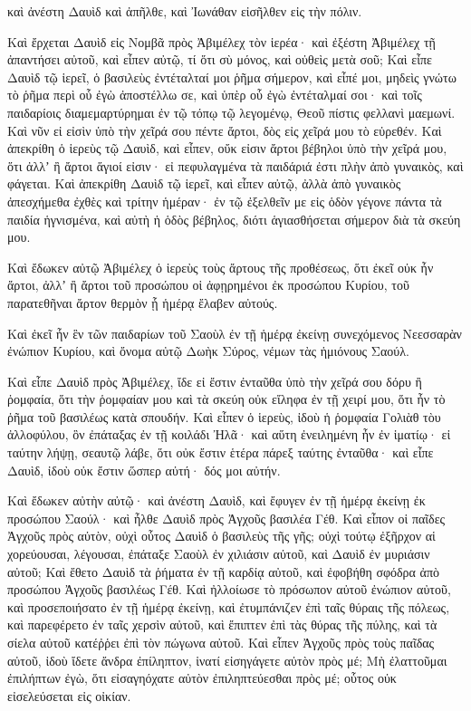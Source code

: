 {καὶ ἀνέστη Δαυὶδ καὶ ἀπῆλθε, καὶ Ἰωνάθαν εἰσῆλθεν εἰς τὴν πόλιν.
\par }{\PP {}Καὶ ἔρχεται Δαυὶδ εἰς Νομβᾶ πρὸς Ἀβιμέλεχ τὸν ἱερέα· καὶ ἐξέστη Ἀβιμέλεχ τῇ ἀπαντήσει αὐτοῦ, καὶ εἶπεν αὐτῷ, τί ὅτι σὺ μόνος, καὶ οὐθεὶς μετὰ σοῦ;
Καὶ εἶπε Δαυὶδ τῷ ἱερεῖ, ὁ βασιλεὺς ἐντέταλταί μοι ῥῆμα σήμερον, καὶ εἶπέ μοι, μηδεὶς γνώτω τὸ ῥῆμα περὶ οὗ ἐγὼ ἀποστέλλω σε, καὶ ὑπὲρ οὗ ἐγὼ ἐντέταλμαί σοι· καὶ τοῖς παιδαρίοις διαμεμαρτύρημαι ἐν τῷ τόπῳ τῷ λεγομένῳ, Θεοῦ πίστις φελλανὶ μαεμωνί.
Καὶ νῦν εἰ εἰσὶν ὑπὸ τὴν χεῖρά σου πέντε ἄρτοι, δὸς εἰς χεῖρά μου τὸ εὑρεθέν.
Καὶ ἀπεκρίθη ὁ ἱερεὺς τῷ Δαυὶδ, καὶ εἶπεν, οὔκ εἰσιν ἄρτοι βέβηλοι ὑπὸ τὴν χεῖρά μου, ὅτι ἀλλʼ ἢ ἄρτοι ἅγιοί εἰσιν· εἰ πεφυλαγμένα τὰ παιδάριά ἐστι πλὴν ἀπὸ γυναικὸς, καὶ φάγεται.
Καὶ ἀπεκρίθη Δαυὶδ τῷ ἱερεῖ, καὶ εἶπεν αὐτῷ, ἀλλὰ ἀπὸ γυναικὸς ἀπεσχήμεθα ἐχθὲς καὶ τρίτην ἡμέραν· ἐν τῷ ἐξελθεῖν με εἰς ὁδὸν γέγονε πάντα τὰ παιδία ἡγνισμένα, καὶ αὐτὴ ἡ ὁδὸς βέβηλος, διότι ἁγιασθήσεται σήμερον διὰ τὰ σκεύη μου.
\par }{\PP {}Καὶ ἔδωκεν αὐτῷ Ἀβιμέλεχ ὁ ἱερεὺς τοὺς ἄρτους τῆς προθέσεως, ὅτι ἐκεῖ οὐκ ἦν ἄρτοι, ἀλλʼ ἢ ἄρτοι τοῦ προσώπου οἱ ἀφῃρημένοι ἐκ προσώπου Κυρίου, τοῦ παρατεθῆναι ἄρτον θερμὸν ᾗ ἡμέρᾳ ἔλαβεν αὐτούς.
\par }{\PP {}Καὶ ἐκεῖ ἦν ἓν τῶν παιδαρίων τοῦ Σαοὺλ ἐν τῇ ἡμέρᾳ ἐκείνῃ συνεχόμενος Νεεσσαρὰν ἐνώπιον Κυρίου, καὶ ὄνομα αὐτῷ Δωὴκ Σύρος, νέμων τὰς ἡμιόνους Σαούλ.
\par }{\PP {}Καὶ εἶπε Δαυὶδ πρὸς Ἀβιμέλεχ, ἴδε εἰ ἔστιν ἐνταῦθα ὑπὸ τὴν χεῖρά σου δόρυ ἢ ῥομφαία, ὅτι τὴν ῥομφαίαν μου καὶ τὰ σκεύη οὐκ εἴληφα ἐν τῇ χειρί μου, ὅτι ἦν τὸ ῥῆμα τοῦ βασιλέως κατὰ σπουδήν.
Καὶ εἶπεν ὁ ἱερεὺς, ἰδοὺ ἡ ῥομφαία Γολιὰθ τὸυ ἀλλοφύλου, ὃν ἐπάταξας ἐν τῇ κοιλάδι Ἠλᾶ· καὶ αὕτη ἐνειλημένη ἦν ἐν ἱματίῳ· εἰ ταύτην λήψῃ, σεαυτῷ λάβε, ὅτι οὐκ ἔστιν ἑτέρα πάρεξ ταύτης ἐνταῦθα· καὶ εἶπε Δαυὶδ, ἰδοὺ οὐκ ἔστιν ὥσπερ αὐτή· δός μοι αὐτήν.
\par }{\PP {}Καὶ ἔδωκεν αὐτὴν αὐτῷ· καὶ ἀνέστη Δαυὶδ, καὶ ἔφυγεν ἐν τῇ ἡμέρᾳ ἐκείνῃ ἐκ προσώπου Σαούλ· καὶ ἦλθε Δαυὶδ πρὸς Ἀγχοῦς βασιλέα Γέθ.
Καὶ εἶπον οἱ παῖδες Ἀγχοῦς πρὸς αὐτὸν, οὐχὶ οὗτος Δαυὶδ ὁ βασιλεὺς τῆς γῆς; οὐχὶ τούτῳ ἐξῆρχον αἱ χορεύουσαι, λέγουσαι, ἐπάταξε Σαοὺλ ἐν χιλιάσιν αὐτοῦ, καὶ Δαυὶδ ἐν μυριάσιν αὐτοῦ;
Καὶ ἔθετο Δαυὶδ τὰ ῥήματα ἐν τῇ καρδίᾳ αὐτοῦ, καὶ ἐφοβήθη σφόδρα ἀπὸ προσώπου Ἀγχοῦς βασιλέως Γέθ.
Καὶ ἠλλοίωσε τὸ πρόσωπον αὐτοῦ ἐνώπιον αὐτοῦ, καὶ προσεποιήσατο ἐν τῇ ἡμέρᾳ ἐκείνῃ, καὶ ἐτυμπάνιζεν ἐπὶ ταῖς θύραις τῆς πόλεως, καὶ παρεφέρετο ἐν ταῖς χερσὶν αὐτοῦ, καὶ ἔπιπτεν ἐπὶ τὰς θύρας τῆς πύλης, καὶ τὰ σίελα αὐτοῦ κατέῤῥει ἐπὶ τὸν πώγωνα αὐτοῦ.
Καὶ εἶπεν Ἀγχοῦς πρὸς τοὺς παῖδας αὐτοῦ, ἰδοὺ ἴδετε ἄνδρα ἐπίληπτον, ἱνατί εἰσηγάγετε αὐτὸν πρὸς μέ;
Μὴ ἐλαττοῦμαι ἐπιλήπτων ἐγὼ, ὅτι εἰσαγηόχατε αὐτὸν ἐπιληπτεύεσθαι πρὸς μέ; οὗτος οὐκ εἰσελεύσεται εἰς οἰκίαν.

}

